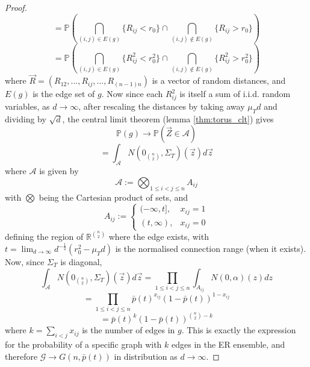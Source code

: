 \documentclass{article}
\newcommand{\tti}{\rightarrow\infty}
\newcommand{\prob}[1]{\mathbb{P}\left(#1\right)}
\begin{document}
\begin{proof}
    \begin{equation}
        = \prob{\bigcap_{(i,j) \in E(g)} \{R_{ij} < r_0\} \cap \bigcap_{(i,j) \notin E(g)} \{R_{ij} > r_0\}}
    \end{equation}
    \begin{equation}
        = \prob{\bigcap_{(i,j) \in E(g)} \{R_{ij}^2 < r_0^2\} \cap \bigcap_{(i,j) \notin E(g)} \{R_{ij}^2 > r_0^2\}}
    \end{equation}
    where $\vec{R} = (R_{12},...,R_{ij},...,R_{(n-1)n})$ is a vector of random distances, and $E(g)$ is the edge set of $g$. Now since each $R_{ij}^2$ is itself a sum of i.i.d. random variables, as $d\tti$, after rescaling the distances by taking away $\mu_Td$ and dividing by $\sqrt{d}$, the central limit theorem (lemma \ref{thm:torus_clt}) gives
    \begin{equation}
        \prob{g} \rightarrow \prob{\vec{Z} \in \mathcal{A}}
    \end{equation}
    \begin{equation}
        \label{eq:torus_joint_gaussian}
        = \int_{\mathcal{A}} N(0_{\binom{n}{2}},\Sigma_T)(\vec{z})d\vec{z}
    \end{equation}
    where $\mathcal{A}$ is given by
    \begin{equation}
        \mathcal{A} := \bigotimes_{1 \leq i < j \leq n} A_{ij}
    \end{equation}
    with $\bigotimes$ being the Cartesian product of sets, and
    \begin{equation}
        A_{ij} := \begin{cases}
            (-\infty, t], & x_{ij}=1 \\
            (t, \infty), & x_{ij}=0
        \end{cases}
    \end{equation}
    defining the region of $\mathbb{R}^{\binom{n}{2}}$ where the edge exists, with $t= \lim_{d\tti} d^{-\frac{1}{2}}(r_0^2 - \mu_Td)$ is the normalised connection range (when it exists).  Now, since $\Sigma_T$ is diagonal, 
    \begin{equation}
        \int_{\mathcal{A}} N(0_{\binom{n}{2}},\Sigma_T)(\vec{z})d\vec{z} = \prod_{1\leq i<j \leq n} \int_{A_{ij}} N(0,\alpha)(z)dz
    \end{equation}
    \begin{equation}
        = \prod_{1\leq i < j \leq n} \bar{p}(t)^{x_{ij}}(1-\bar{p}(t))^{1-x_{ij}}
    \end{equation}
    \begin{equation}
        = \bar{p}(t)^k(1-\bar{p}(t))^{\binom{n}{2}-k}
    \end{equation} 
    where $k = \sum_{i<j} x_{ij}$ is the number of edges in $g$. This is exactly the expression for the probability of a specific graph with $k$ edges in the ER ensemble, and therefore $\mathcal{G} \rightarrow G(n,\bar{p}(t))$ in distribution as $d\tti$.
\end{proof}
\end{document}

